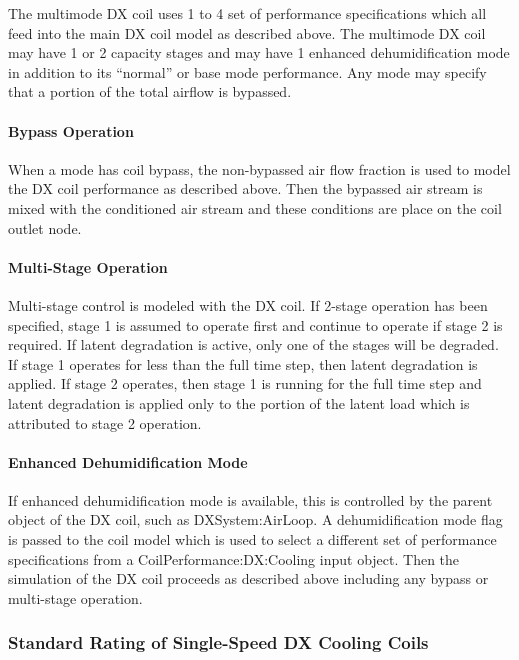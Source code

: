 The multimode DX coil uses 1 to 4 set of performance specifications which all feed into the main DX coil model as described above. The multimode DX coil may have 1 or 2 capacity stages and may have 1 enhanced dehumidification mode in addition to its ``normal'' or base mode performance. Any mode may specify that a portion of the total airflow is bypassed.

\paragraph{Bypass Operation}\label{bypass-operation}

When a mode has coil bypass, the non-bypassed air flow fraction is used to model the DX coil performance as described above. Then the bypassed air stream is mixed with the conditioned air stream and these conditions are place on the coil outlet node.

\paragraph{Multi-Stage Operation}\label{multi-stage-operation}

Multi-stage control is modeled with the DX coil. If 2-stage operation has been specified, stage 1 is assumed to operate first and continue to operate if stage 2 is required. If latent degradation is active, only one of the stages will be degraded. If stage 1 operates for less than the full time step, then latent degradation is applied. If stage 2 operates, then stage 1 is running for the full time step and latent degradation is applied only to the portion of the latent load which is attributed to stage 2 operation.

\paragraph{Enhanced Dehumidification Mode}\label{enhanced-dehumidification-mode}

If enhanced dehumidification mode is available, this is controlled by the parent object of the DX coil, such as DXSystem:AirLoop. A dehumidification mode flag is passed to the coil model which is used to select a different set of performance specifications from a CoilPerformance:DX:Cooling input object. Then the simulation of the DX coil proceeds as described above including any bypass or multi-stage operation.

\subsubsection{Standard Rating of Single-Speed DX Cooling Coils}\label{standard-rating-of-single-speed-dx-cooling-coils}

